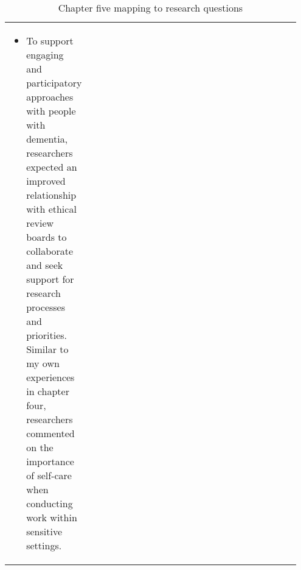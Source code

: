 \begin{table}[htp]
\begin{tabular}{p{0.15\linewidth} | p{0.8\linewidth}}
\begin{itemize}
        \item To support engaging and participatory approaches with people with dementia, researchers expected an improved relationship with ethical review boards to collaborate and seek support for research processes and priorities. Similar to my own experiences in chapter four, researchers commented on the importance of self-care when conducting work within sensitive settings. 
      \end{itemize}
    \\ 
    
    \end{tabular}
    \caption{Chapter five mapping to research questions}
    \label{chapterFourRQ}
\end{table}



